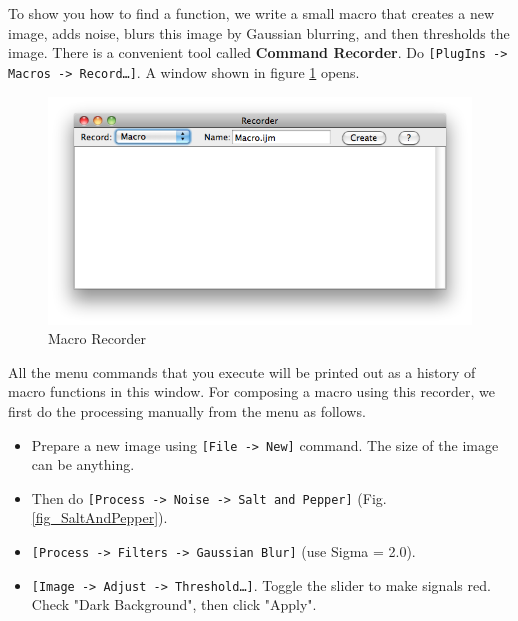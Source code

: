 \documentclass[11pt,a4paper,oneside]{report}
\newcommand{\ijmenu}[1]{\texttt{\small#1}}
\begin{document}
To show you how to find a function, we write a small macro that creates a new image, adds noise, blurs this image by Gaussian blurring, and then thresholds the image. There is a convenient tool called \textbf{Command Recorder}. 
Do \ijmenu{[PlugIns -> Macros -> Record\ldots]}. A window shown in figure
\ref{fig_macroRecorderBlank} opens.

\begin{figure}[htbp]
\begin{center}
\includegraphics[scale=0.6]{fig/MacroRecorderBlank.png}
\caption{Macro Recorder} \label{fig_macroRecorderBlank}
\end{center}
\end{figure}

All the menu commands that you execute will be printed out as a history of macro functions in this window. For composing a macro using this recorder, we first do the processing manually from the menu as follows. 
\begin{itemize}
  \item Prepare a new image using \ijmenu{[File -> New]} command. The size of the image can be anything.
  \item Then do \ijmenu{[Process -> Noise -> Salt and Pepper]} (Fig.
  \ref{fig_SaltAndPepper}).
  \item \ijmenu{[Process -> Filters -> Gaussian Blur]} (use Sigma = 2.0).
  \item \ijmenu{[Image -> Adjust -> Threshold\ldots]}. Toggle the slider to make
  signals red. Check "Dark Background", then click "Apply".
\end{itemize}
 
\end{document}
